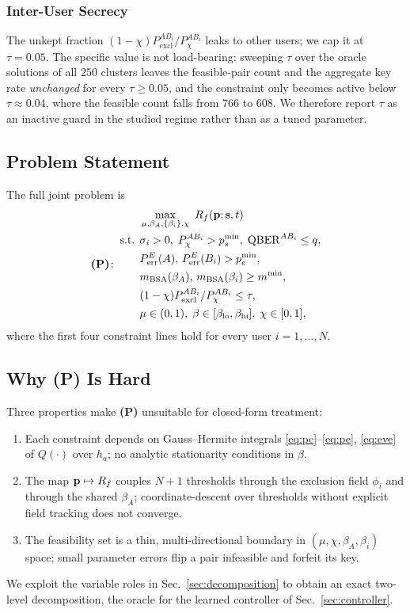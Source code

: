 \subsubsection{Inter-User Secrecy}
The unkept fraction $(1-\chi)P^{AB_i}_{\mathrm{excl}}/P^{AB_i}_\chi$ leaks to other users; we cap it at $\tau{=}0.05$. The specific value is not load-bearing: sweeping $\tau$ over the oracle solutions of all $250$ clusters leaves the feasible-pair count and the aggregate key rate \emph{unchanged} for every $\tau \ge 0.05$, and the constraint only becomes active below $\tau \approx 0.04$, where the feasible count falls from $766$ to $608$. We therefore report $\tau$ as an inactive guard in the studied regime rather than as a tuned parameter.

\subsection{Problem Statement}

The full joint problem is
\begin{equation}\label{eq:problemP}
\textbf{(P)}\!:\;
\begin{aligned}
&\max_{\mu,\beta_A,\{\beta_i\},\chi}\ R_f(\mathbf{p};\mathbf{s},t)\\
\text{s.t.}\;\,
&\sigma_i > 0,\; P^{AB_i}_\chi > p_s^{\min},\; \mathrm{QBER}^{AB_i} \le q,\\
&P_{\mathrm{err}}^E(A),\,P_{\mathrm{err}}^E(B_i) > p_e^{\min},\\
&m_{\mathrm{BSA}}(\beta_A),\,m_{\mathrm{BSA}}(\beta_i) \ge m^{\min},\\
&(1-\chi)P^{AB_i}_{\mathrm{excl}}/P^{AB_i}_\chi \le \tau,\\
&\mu\in(0,1),\;\beta\in[\beta_{\mathrm{lo}},\beta_{\mathrm{hi}}],\;\chi\in[0,1],
\end{aligned}
\end{equation}
where the first four constraint lines hold for every user $i=1,\dots,N$.

\subsection{Why \textbf{(P)} Is Hard}

Three properties make \textbf{(P)} unsuitable for closed-form treatment:
\begin{enumerate}
\item Each constraint depends on Gauss--Hermite integrals \eqref{eq:pc}--\eqref{eq:pe}, \eqref{eq:eve} of $Q(\cdot)$ over $h_a$; no analytic stationarity conditions in $\beta$.
\item The map $\mathbf{p}\mapsto R_f$ couples $N+1$ thresholds through the exclusion field $\phi_i$ and through the shared $\beta_A$; coordinate-descent over thresholds without explicit field tracking does not converge.
\item The feasibility set is a thin, multi-directional boundary in $(\mu,\chi,\beta_A,\beta_i)$ space; small parameter errors flip a pair infeasible and forfeit its key.
\end{enumerate}
We exploit the variable roles in Sec.~\ref{sec:decomposition} to obtain an exact two-level decomposition, the oracle for the learned controller of Sec.~\ref{sec:controller}.
